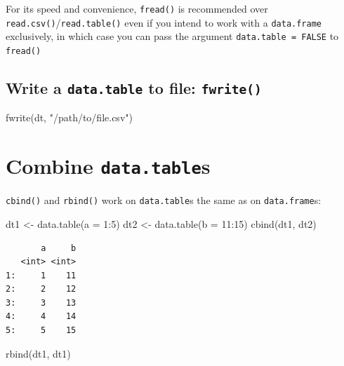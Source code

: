 \documentclass[
]{book}
\newenvironment{Shaded}{\begin{snugshade}}{\end{snugshade}}
\newcommand{\AttributeTok}[1]{\textcolor[rgb]{0.77,0.63,0.00}{#1}}
\newcommand{\DecValTok}[1]{\textcolor[rgb]{0.00,0.00,0.81}{#1}}
\newcommand{\FunctionTok}[1]{\textcolor[rgb]{0.00,0.00,0.00}{#1}}
\newcommand{\NormalTok}[1]{#1}
\newcommand{\OtherTok}[1]{\textcolor[rgb]{0.56,0.35,0.01}{#1}}
\newcommand{\SpecialCharTok}[1]{\textcolor[rgb]{0.00,0.00,0.00}{#1}}
\newcommand{\StringTok}[1]{\textcolor[rgb]{0.31,0.60,0.02}{#1}}
\begin{document}
For its speed and convenience, \texttt{fread()} is recommended over \texttt{read.csv()}/\texttt{read.table()} even if you intend to work with a \texttt{data.frame} exclusively, in which case you can pass the argument \texttt{data.table\ =\ FALSE} to \texttt{fread()}

\hypertarget{write-a-data.table-to-file-fwrite}{%
\subsection{\texorpdfstring{Write a \texttt{data.table} to file: \texttt{fwrite()}}{Write a data.table to file: fwrite()}}\label{write-a-data.table-to-file-fwrite}}

\begin{Shaded}
\begin{Highlighting}[]
\FunctionTok{fwrite}\NormalTok{(dt, }\StringTok{"/path/to/file.csv"}\NormalTok{)}
\end{Highlighting}
\end{Shaded}

\hypertarget{combine-data.tables}{%
\section{\texorpdfstring{Combine \texttt{data.table}s}{Combine data.tables}}\label{combine-data.tables}}

\texttt{cbind()} and \texttt{rbind()} work on \texttt{data.table}s the same as on \texttt{data.frame}s:

\begin{Shaded}
\begin{Highlighting}[]
\NormalTok{dt1 }\OtherTok{\textless{}{-}} \FunctionTok{data.table}\NormalTok{(}\AttributeTok{a =} \DecValTok{1}\SpecialCharTok{:}\DecValTok{5}\NormalTok{)}
\NormalTok{dt2 }\OtherTok{\textless{}{-}} \FunctionTok{data.table}\NormalTok{(}\AttributeTok{b =} \DecValTok{11}\SpecialCharTok{:}\DecValTok{15}\NormalTok{)}
\FunctionTok{cbind}\NormalTok{(dt1, dt2)}
\end{Highlighting}
\end{Shaded}

\begin{verbatim}
       a     b
   <int> <int>
1:     1    11
2:     2    12
3:     3    13
4:     4    14
5:     5    15
\end{verbatim}

\begin{Shaded}
\begin{Highlighting}[]
\FunctionTok{rbind}\NormalTok{(dt1, dt1)}
\end{Highlighting}
\end{Shaded}
\end{document}
